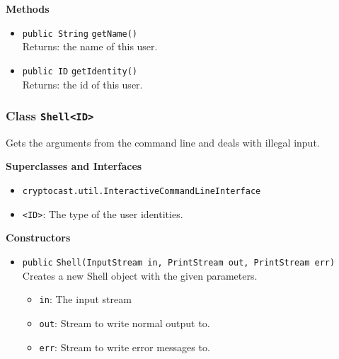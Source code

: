 \textbf{Methods}
\begin{itemize}
\item \lstinline|public String| \lstinline|getName|\lstinline|()|\\
Returns: the name of this user.



\item \lstinline|public ID| \lstinline|getIdentity|\lstinline|()|\\
Returns: the id of this user.



\end{itemize}

\subsubsection{Class \lstinline|Shell<ID>|}
Gets the arguments from the command line and deals with illegal input. \\



\textbf{Superclasses and Interfaces}
\begin{itemize}
\item \lstinline|cryptocast.util.InteractiveCommandLineInterface|
\end{itemize}

\begin{itemize}
\item \lstinline|<ID>|: The type of the user identities.
\end{itemize}


\textbf{Constructors}
\begin{itemize}
\item \lstinline|public| \lstinline|Shell|\lstinline|(InputStream in, PrintStream out, PrintStream err)|\\
Creates a new Shell object with the given parameters.
\begin{itemize}
\item \lstinline|in|: The input stream
\item \lstinline|out|: Stream to write normal output to.
\item \lstinline|err|: Stream to write error messages to.
\end{itemize}



\end{itemize}


